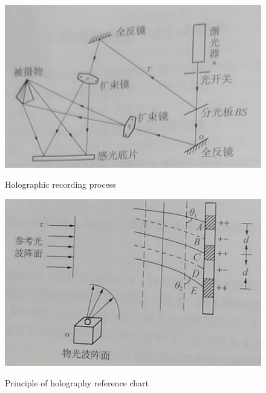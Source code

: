 \documentclass[UTF8]{article}
\begin{document}
    \begin{figure}[H]
              \begin{minipage}[t]{0.5\linewidth}
                 \centering
                 \includegraphics[clip,scale=0.51,trim={0 0 0 0}]{fig/fig2.png}
                 \label{figure.11}
                 \caption{Holographic recording process}
              \end{minipage}
              \begin{minipage}[t]{0.5\linewidth}
                 \centering
                 \includegraphics[clip,scale=0.49,trim={0 0 0 0}]{fig/fig3.png}
                 \label{figure.12}
                 \caption{Principle of holography reference chart}
              \end{minipage}   	  
           \end{figure}  
           
\end{document}

